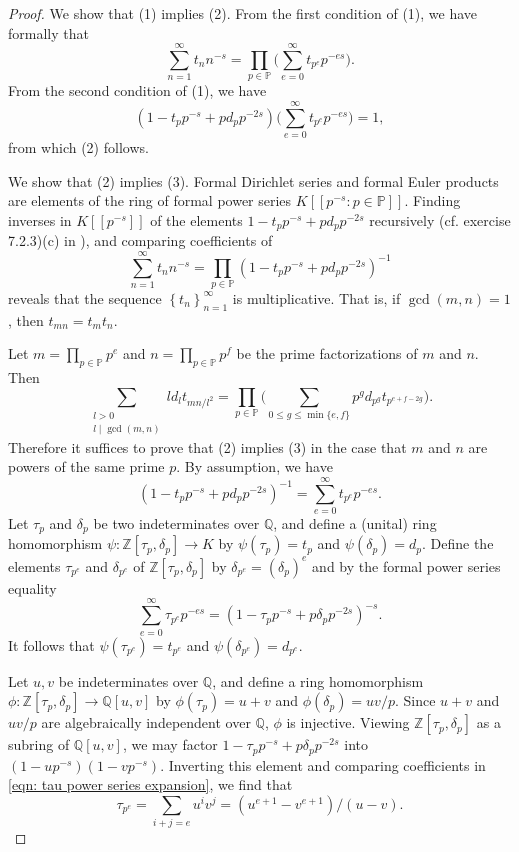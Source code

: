 \documentclass[10pt,leqno,twoside]{article}
\theoremstyle{plain}
\theoremstyle{definition}
\numberwithin{equation}{section}
\numberwithin{lem}{section}
\newcommand{\cbr}[1]{\left\{#1\right\}}
\begin{document}
\begin{proof}
    We show that (1) implies (2). From the first condition of (1), we have formally that 
    \[\sum_{n=1}^\infty t_nn^{-s} = \prod_{p\in\mathbb P}\bigg(\sum_{e=0}^\infty t_{p^e}p^{-es}\bigg).\]
    From the second condition of (1), we have \[(1-t_pp^{-s} + pd_pp^{-2s})\bigg(\sum_{e=0}^\infty t_{p^e}p^{-es}\bigg) = 1,\] from which (2) follows. 

    We show that (2) implies (3). Formal Dirichlet series and formal Euler products are elements of the ring of formal power series $K[[p^{-s} : p\in\mathbb P]]$. Finding inverses in $K[[p^{-s}]]$ of the elements $1-t_pp^{-s} + pd_pp^{-2s}$ recursively (cf. exercise 7.2.3)(c) in \cite{df}), and comparing coefficients of \[\sum_{n=1}^\infty t_nn^{-s} = \prod_{p\in\mathbb P}(1-t_pp^{-s} + pd_pp^{-2s})^{-1}\] reveals that the sequence $\cbr{t_n}_{n=1}^\infty$ is multiplicative. That is, if $\gcd(m,n) =1$, then $t_{mn} = t_mt_n$.
    
    Let $m = \prod_{p\in\mathbb P}p^e$ and $n = \prod_{p\in\mathbb P}p^f$ be the prime factorizations of $m$ and $n$. Then \[\sum_{\substack{l>0\\l\mid\gcd(m,n)}} ld_lt_{mn/l^2} = \prod_{p\in\mathbb P} \bigg(\sum_{0\leq g\leq\min\{e,f\}}p^gd_{p^g}t_{p^{e+f-2g}}\bigg).\] Therefore it suffices to prove that (2) implies (3) in the case that $m$ and $n$ are powers of the same prime $p$. By assumption, we have 
    \[(1-t_pp^{-s} + pd_pp^{-2s})^{-1} = \sum_{e=0}^\infty t_{p^e}p^{-es}.\] Let $\tau_p$ and $\delta_p$ be two indeterminates over $\mathbb Q$, and define a (unital) ring homomorphism $\psi\colon \mathbb Z[\tau_p,\delta_p]\to K$ by $\psi(\tau_p) = t_p$ and $\psi(\delta_p) = d_p$. Define the elements $\tau_{p^e}$ and $\delta_{p^e}$ of $\mathbb Z[\tau_p,\delta_p]$ by $\delta_{p^e} = (\delta_p)^e$ and by the formal power series equality 
    \begin{equation}\label{eqn: tau power series expansion}
        \sum_{e=0}^\infty \tau_{p^e}p^{-es} = (1-\tau_pp^{-s} + p\delta_pp^{-2s})^{-s}.
    \end{equation} It follows that $\psi(\tau_{p^e}) = t_{p^e}$ and $\psi(\delta_{p^e}) = d_{p^e}$.

    Let $u,v$ be indeterminates over $\mathbb Q$, and define a ring homomorphism $\phi\colon \mathbb Z[\tau_p,\delta_p]\to \mathbb Q[u,v]$ by $\phi(\tau_p) = u+v$ and $\phi(\delta_p) = uv/p$. Since $u+v$ and $uv/p$ are algebraically independent over $\mathbb Q$, $\phi$ is injective. Viewing $\mathbb Z[\tau_p,\delta_p]$ as a subring of $\mathbb Q[u,v]$, we may factor $1-\tau_pp^{-s}+p\delta_pp^{-2s}$ into $(1-up^{-s})(1-vp^{-s})$. Inverting this element and comparing coefficients in \cref{eqn: tau power series expansion}, we find that
    \[\tau_{p^e} = \sum_{i+j=e}u^iv^j = (u^{e+1}-v^{e+1})/(u-v).\]


\end{proof}
\end{document}
